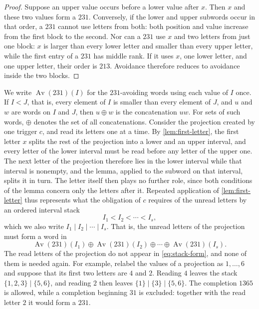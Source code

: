 \documentclass[11pt,reqno]{amsart}
\theoremstyle{definition}
\theoremstyle{remark}
\newcommand{\Av}{\operatorname{Av}}
\begin{document}
\begin{proof}
Suppose an upper value occurs before a lower value after $x$.  Then $x$ and
these two values form a $231$.  Conversely, if the lower and upper subwords occur in
that order, a $231$ cannot use letters from both: both position and value
increase from the first block to the second.  Nor can a $231$ use $x$ and
two letters from just one block: $x$ is larger than every lower letter and
smaller than every upper letter, while the first entry of a $231$ has
middle rank.  If it uses $x$, one lower letter, and one upper letter, their
order is $213$.  Avoidance therefore reduces to avoidance inside the two
blocks.
\end{proof}

We write $\Av(231)(I)$ for the $231$-avoiding words using each value of $I$
once.  If $I<J$, that is, every element of $I$ is smaller than every
element of $J$, and $u$ and $w$ are words on $I$ and $J$, then $u\oplus w$
is the concatenation $uw$.  For sets of such words, $\oplus$ denotes the set
of all concatenations.  Consider the projection created by one trigger $c$,
and read its letters one at a time.  By \cref{lem:first-letter}, the first
letter $x$ splits the rest of the projection into a lower and an upper
interval, and every letter of the lower interval must be read before any
letter of the upper one.  The next letter of the projection therefore lies
in the lower interval while that interval is nonempty, and the lemma,
applied to the subword on that interval, splits it in turn.  The letter itself then
plays no further role, since both conditions of the lemma concern only the
letters after it.  Repeated application
of \cref{lem:first-letter} thus represents what the obligation of $c$
requires of the unread letters by an ordered interval stack
\[
  I_1<I_2<\cdots<I_s,
\]
which we also write $I_1\mid I_2\mid\cdots\mid I_s$.  That is, the unread letters of the projection must form a word in
\begin{equation}\label{eq:stack-form}
  \Av(231)(I_1)\oplus\Av(231)(I_2)\oplus\cdots
  \oplus\Av(231)(I_s).
\end{equation}
The read letters of the projection do not appear in \eqref{eq:stack-form},
and none of them is needed again.  For example, relabel the values of a projection as
$1,\ldots,6$ and suppose that its first two letters are $4$ and $2$.
Reading $4$ leaves the stack $\{1,2,3\}\mid\{5,6\}$, and reading $2$ then
leaves $\{1\}\mid\{3\}\mid\{5,6\}$.  The completion $1365$ is allowed,
while a completion beginning $31$ is excluded: together with the read
letter $2$ it would form a $231$.
\end{document}

